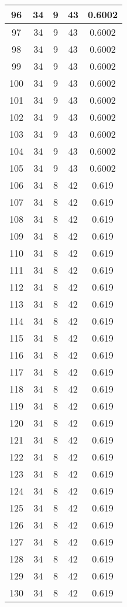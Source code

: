 \documentclass[letterpaper, 12pt]{article}
\begin{document}
\begin{longtable}{|c|c|c|c|c|}
\hline
96 & 34 & 9 & 43 & 0.6002 \\
\hline
97 & 34 & 9 & 43 & 0.6002 \\
\hline
98 & 34 & 9 & 43 & 0.6002 \\
\hline
99 & 34 & 9 & 43 & 0.6002 \\
\hline
100 & 34 & 9 & 43 & 0.6002 \\
\hline
101 & 34 & 9 & 43 & 0.6002 \\
\hline
102 & 34 & 9 & 43 & 0.6002 \\
\hline
103 & 34 & 9 & 43 & 0.6002 \\
\hline
104 & 34 & 9 & 43 & 0.6002 \\
\hline
105 & 34 & 9 & 43 & 0.6002 \\
\hline
106 & 34 & 8 & 42 & 0.619 \\
\hline
107 & 34 & 8 & 42 & 0.619 \\
\hline
108 & 34 & 8 & 42 & 0.619 \\
\hline
109 & 34 & 8 & 42 & 0.619 \\
\hline
110 & 34 & 8 & 42 & 0.619 \\
\hline
111 & 34 & 8 & 42 & 0.619 \\
\hline
112 & 34 & 8 & 42 & 0.619 \\
\hline
113 & 34 & 8 & 42 & 0.619 \\
\hline
114 & 34 & 8 & 42 & 0.619 \\
\hline
115 & 34 & 8 & 42 & 0.619 \\
\hline
116 & 34 & 8 & 42 & 0.619 \\
\hline
117 & 34 & 8 & 42 & 0.619 \\
\hline
118 & 34 & 8 & 42 & 0.619 \\
\hline
119 & 34 & 8 & 42 & 0.619 \\
\hline
120 & 34 & 8 & 42 & 0.619 \\
\hline
121 & 34 & 8 & 42 & 0.619 \\
\hline
122 & 34 & 8 & 42 & 0.619 \\
\hline
123 & 34 & 8 & 42 & 0.619 \\
\hline
124 & 34 & 8 & 42 & 0.619 \\
\hline
125 & 34 & 8 & 42 & 0.619 \\
\hline
126 & 34 & 8 & 42 & 0.619 \\
\hline
127 & 34 & 8 & 42 & 0.619 \\
\hline
128 & 34 & 8 & 42 & 0.619 \\
\hline
129 & 34 & 8 & 42 & 0.619 \\
\hline
130 & 34 & 8 & 42 & 0.619 \\

\end{longtable}
\end{document}
